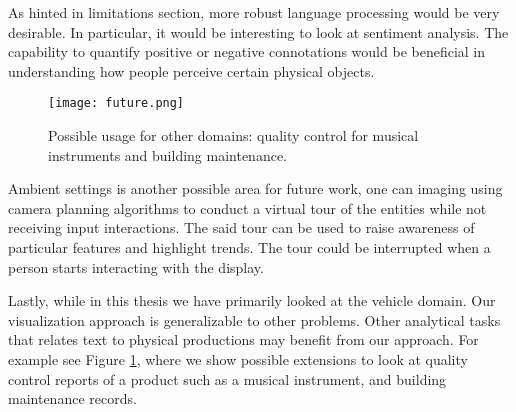 As hinted in limitations section, more robust language processing would be very
desirable. In particular, it would be interesting to look at sentiment analysis.
The capability to quantify positive or negative connotations would be beneficial
in understanding how people perceive certain physical objects.

	\begin{figure}
	 \centering  
	 \texttt{[image: future.png]}  
	 \caption[Other Uses]{Possible usage for other domains: quality control for
	 musical instruments and building maintenance.}
	 \label{figure:future}
	\end{figure}

Ambient settings is another possible area for future work, one can imaging using
camera planning algorithms to conduct a virtual tour of the entities while not
receiving input interactions. The said tour can be used to raise awareness of
particular features and highlight trends. The tour could be interrupted when a
person starts interacting with the display.

Lastly, while in this thesis we have primarily looked at the vehicle domain. Our
visualization approach is generalizable to other problems. Other analytical
tasks that relates text to physical productions may benefit from our approach. For
example see Figure \ref{figure:future}, where we show possible extensions
to look at quality control reports of a product such as a musical instrument,
and building maintenance records.


